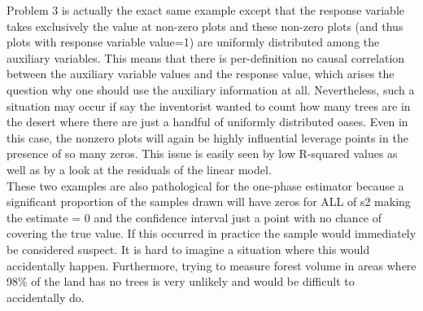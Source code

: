 \documentclass{article}
\begin{document}
Problem 3 is actually the exact same example except that the response variable takes exclusively the value  at non-zero plots and these non-zero plots (and thus plots with response variable value=1) are uniformly distributed among the auxiliary variables. This means that there is per-definition no causal correlation between the auxiliary variable values and the response value, which arises the question why one should use the auxiliary information at all. Nevertheless, such a situation may occur if say the inventorist wanted to count how many trees are in the desert where there are just a handful of uniformly distributed oases.  Even in this case, the nonzero plots will again be highly influential leverage points in the presence of so many zeros. This issue is easily seen by low R-squared values as well as by a look at the residuals of the linear model.\\

These two examples are also pathological for the one-phase estimator because a significant proportion of the samples drawn will have zeros for ALL of s2 making the estimate = 0 and the confidence interval just a point with no chance of covering the true value.  If this occurred in practice the sample would immediately be considered suspect.  It is hard to imagine a situation where this would accidentally happen.  Furthermore, trying to measure forest volume in areas where 98\% of the land has no trees is very unlikely and would be difficult to accidentally do.
\end{document}
